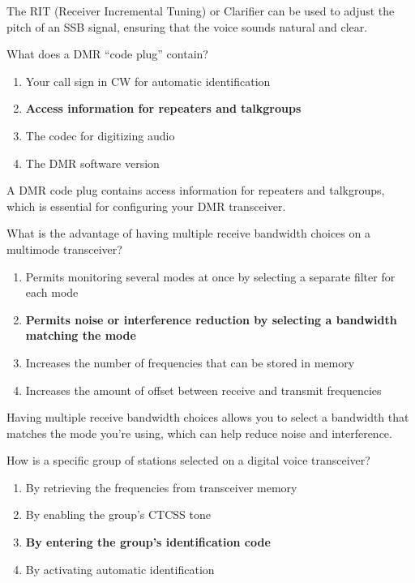 The RIT (Receiver Incremental Tuning) or Clarifier can be used to adjust the pitch of an SSB signal, ensuring that the voice sounds natural and clear.

\begin{tcolorbox}[colback=gray!10!white,colframe=black!75!black,title={T4B07}]
    What does a DMR “code plug” contain?
    \begin{enumerate}[label=\Alph*),noitemsep]
        \item Your call sign in CW for automatic identification
        \item \textbf{Access information for repeaters and talkgroups}
        \item The codec for digitizing audio
        \item The DMR software version
    \end{enumerate}
\end{tcolorbox}

A DMR code plug contains access information for repeaters and talkgroups, which is essential for configuring your DMR transceiver.

\begin{tcolorbox}[colback=gray!10!white,colframe=black!75!black,title={T4B08}]
    What is the advantage of having multiple receive bandwidth choices on a multimode transceiver?
    \begin{enumerate}[label=\Alph*),noitemsep]
        \item Permits monitoring several modes at once by selecting a separate filter for each mode
        \item \textbf{Permits noise or interference reduction by selecting a bandwidth matching the mode}
        \item Increases the number of frequencies that can be stored in memory
        \item Increases the amount of offset between receive and transmit frequencies
    \end{enumerate}
\end{tcolorbox}

Having multiple receive bandwidth choices allows you to select a bandwidth that matches the mode you’re using, which can help reduce noise and interference.

\begin{tcolorbox}[colback=gray!10!white,colframe=black!75!black,title={T4B09}]
    How is a specific group of stations selected on a digital voice transceiver?
    \begin{enumerate}[label=\Alph*),noitemsep]
        \item By retrieving the frequencies from transceiver memory
        \item By enabling the group’s CTCSS tone
        \item \textbf{By entering the group’s identification code}
        \item By activating automatic identification
    \end{enumerate}
\end{tcolorbox}

